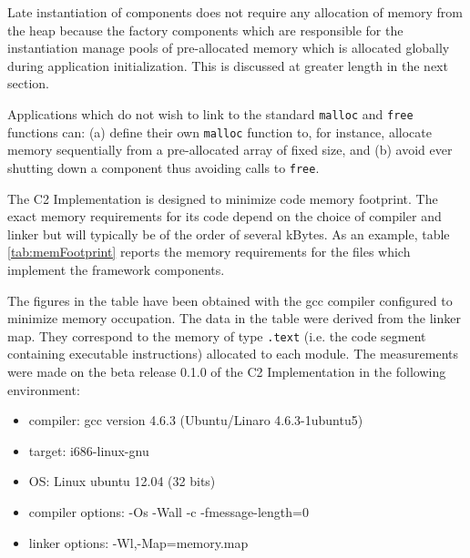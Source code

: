 \documentclass{pnp_article}
\begin{document}
Late instantiation of components does not require any allocation of memory from the heap because the factory components which are responsible for the instantiation manage pools of pre-allocated memory which is allocated globally during application initialization. This is discussed at greater length in the next section.

Applications which do not wish to link to the standard \texttt{malloc} and \texttt{free} functions can: (a) define their own \texttt{malloc} function to, for instance, allocate memory sequentially from a pre-allocated array of fixed size, and (b) avoid ever shutting down a component thus avoiding calls to \texttt{free}. 

The C2 Implementation is designed to minimize code memory footprint. The exact memory requirements for its code depend on the choice of compiler and linker but will typically be of the order of several kBytes. As an example, table \ref{tab:memFootprint} reports the memory requirements for the files which implement the framework components. 

The figures in the table have been obtained with the gcc compiler configured to minimize memory occupation. The data in the table were derived from the linker map. They correspond to the memory of type \texttt{.text} (i.e. the code segment containing executable instructions) allocated to each module. The measurements were made on the beta release 0.1.0 of the C2 Implementation in the following environment:

\begin{itemize}
\item{compiler}: gcc version 4.6.3 (Ubuntu/Linaro 4.6.3-1ubuntu5)
\item{target}: i686-linux-gnu
\item{OS}: Linux ubuntu 12.04 (32 bits)
\item{compiler options}: -Os -Wall -c -fmessage-length=0
\item{linker options}: -Wl,-Map=memory.map
\end{itemize}
\end{document}
